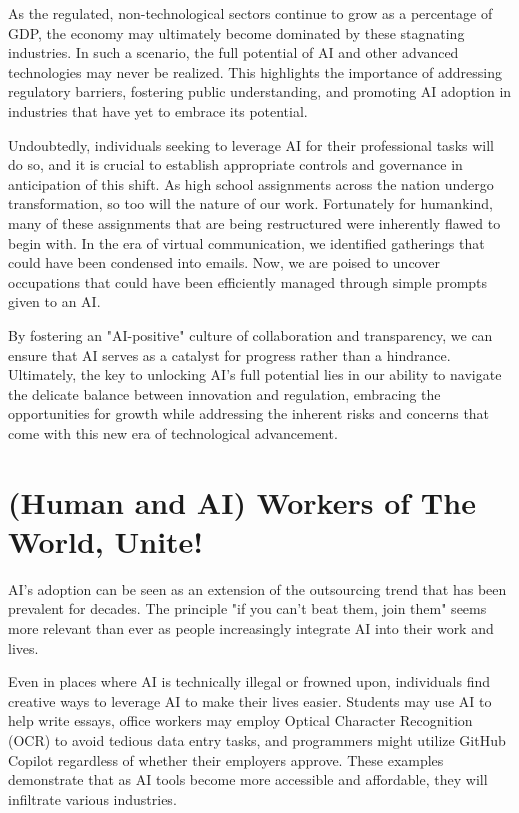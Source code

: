 As the regulated, non-technological sectors continue to grow as a percentage of GDP, the economy may ultimately become dominated by these stagnating industries. In such a scenario, the full potential of AI and other advanced technologies may never be realized. This highlights the importance of addressing regulatory barriers, fostering public understanding, and promoting AI adoption in industries that have yet to embrace its potential.

Undoubtedly, individuals seeking to leverage AI for their professional tasks will do so, and it is crucial to establish appropriate controls and governance in anticipation of this shift. As high school assignments across the nation undergo transformation, so too will the nature of our work. Fortunately for humankind, many of these assignments that are being restructured were inherently flawed to begin with. In the era of virtual communication, we identified gatherings that could have been condensed into emails. Now, we are poised to uncover occupations that could have been efficiently managed through simple prompts given to an AI.

By fostering an "AI-positive" culture of collaboration and transparency, we can ensure that AI serves as a catalyst for progress rather than a hindrance. Ultimately, the key to unlocking AI’s full potential lies in our ability to navigate the delicate balance between innovation and regulation, embracing the opportunities for growth while addressing the inherent risks and concerns that come with this new era of technological advancement.

\section{(Human and AI) Workers of The World, Unite!}

AI’s adoption can be seen as an extension of the outsourcing trend that has been prevalent for decades. The principle "if you can’t beat them, join them" seems more relevant than ever as people increasingly integrate AI into their work and lives.

Even in places where AI is technically illegal or frowned upon, individuals find creative ways to leverage AI to make their lives easier. Students may use AI to help write essays, office workers may employ Optical Character Recognition (OCR) to avoid tedious data entry tasks, and programmers might utilize GitHub Copilot regardless of whether their employers approve. These examples demonstrate that as AI tools become more accessible and affordable, they will infiltrate various industries.

